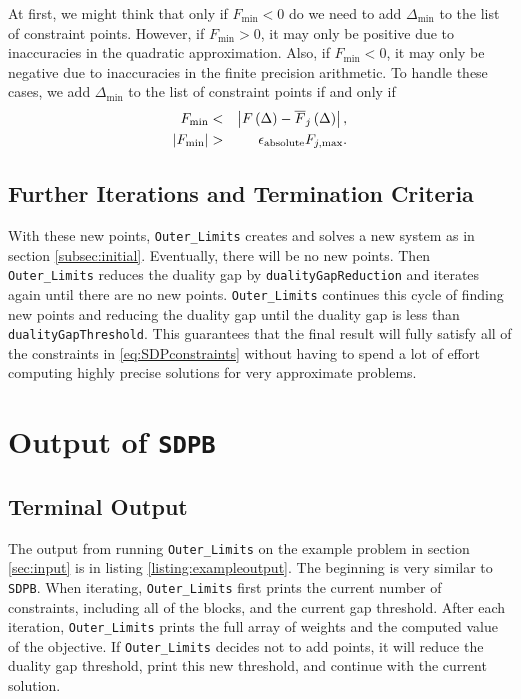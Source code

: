 \documentclass[12pt]{article}
\numberwithin{equation}{section}
\newcommand\SDPB{\texttt{SDPB}}
\begin{document}
At first, we might think that only if $F_{\min}<0$ do we need to add
$\Delta_{\min}$ to the list of constraint points.  However, if
$F_{\min}>0$, it may only be positive due to inaccuracies in the
quadratic approximation.  Also, if $F_{\min}<0$, it may only be
negative due to inaccuracies in the finite precision arithmetic.  To
handle these cases, we add $\Delta_{\min}$ to the list of constraint
points if and only if
\begin{eqnarray}
  F_{\min} & < & \left| F\left(\Delta\right) - \overline{F}_j\left(\Delta\right) \right|, \\
  \left|F_{\min}\right| & > & \epsilon_{\rm{absolute}}F_{j,\max}.
\end{eqnarray}

\subsection{Further Iterations and Termination Criteria}
\label{subsec:furtheriterations}

With these new points, \texttt{Outer\_Limits} creates and solves a new
system as in section \ref{subsec:initial}.  Eventually, there will be
no new points.  Then \texttt{Outer\_Limits} reduces the duality gap by
\texttt{dualityGapReduction} and iterates again until there are no new
points.  \texttt{Outer\_Limits} continues this cycle of finding new
points and reducing the duality gap until the duality gap is less than
\texttt{dualityGapThreshold}.  This guarantees that the final result
will fully satisfy all of the constraints in \ref{eq:SDPconstraints}
without having to spend a lot of effort computing highly precise
solutions for very approximate problems.

\section{Output of \SDPB}

\subsection{Terminal Output}

The output from running \texttt{Outer\_Limits} on the example problem
in section \ref{sec:input} is in listing
\ref{listing:exampleoutput}. The beginning is very similar to
\texttt{SDPB}.  When iterating, \texttt{Outer\_Limits} first prints
the current number of constraints, including all of the blocks, and
the current gap threshold.  After each iteration,
\texttt{Outer\_Limits} prints the full array of weights and the
computed value of the objective.  If \texttt{Outer\_Limits} decides
not to add points, it will reduce the duality gap threshold, print
this new threshold, and continue with the current solution.
\end{document}
